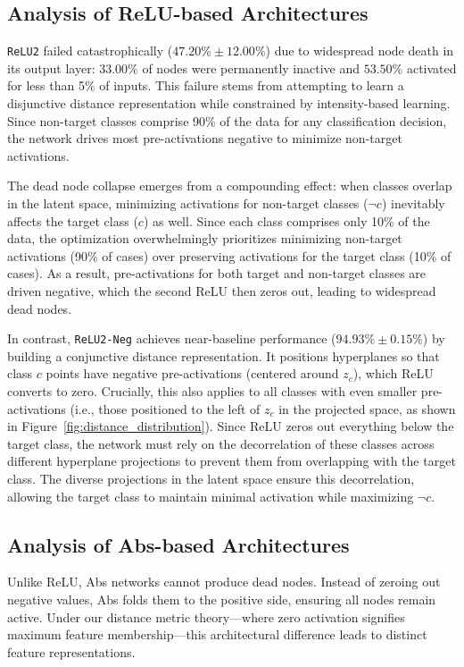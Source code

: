 \subsection{Analysis of ReLU-based Architectures}

\texttt{ReLU2} failed catastrophically ($47.20\% \pm 12.00\%$) due to widespread node death in its output layer: $33.00\%$ of nodes were permanently inactive and $53.50\%$ activated for less than 5\% of inputs. This failure stems from attempting to learn a disjunctive distance representation while constrained by intensity-based learning. Since non-target classes comprise 90\% of the data for any classification decision, the network drives most pre-activations negative to minimize non-target activations.

The dead node collapse emerges from a compounding effect: when classes overlap in the latent space, minimizing activations for non-target classes ($\neg c$) inevitably affects the target class ($c$) as well. Since each class comprises only 10\% of the data, the optimization overwhelmingly prioritizes minimizing non-target activations (90\% of cases) over preserving activations for the target class (10\% of cases). As a result, pre-activations for both target and non-target classes are driven negative, which the second ReLU then zeros out, leading to widespread dead nodes.

In contrast, \texttt{ReLU2-Neg} achieves near-baseline performance ($94.93\% \pm 0.15\%$) by building a conjunctive distance representation. It positions hyperplanes so that class $c$ points have negative pre-activations (centered around $z_c$), which ReLU converts to zero. Crucially, this also applies to all classes with even smaller pre-activations (i.e., those positioned to the left of $z_c$ in the projected space, as shown in Figure~\ref{fig:distance_distribution}). Since ReLU zeros out everything below the target class, the network must rely on the decorrelation of these classes across different hyperplane projections to prevent them from overlapping with the target class. The diverse projections in the latent space ensure this decorrelation, allowing the target class to maintain minimal activation while maximizing $\neg c$.

\subsection{Analysis of Abs-based Architectures}

Unlike ReLU, Abs networks cannot produce dead nodes. Instead of zeroing out negative values, Abs folds them to the positive side, ensuring all nodes remain active. Under our distance metric theory—where zero activation signifies maximum feature membership—this architectural difference leads to distinct feature representations. 

